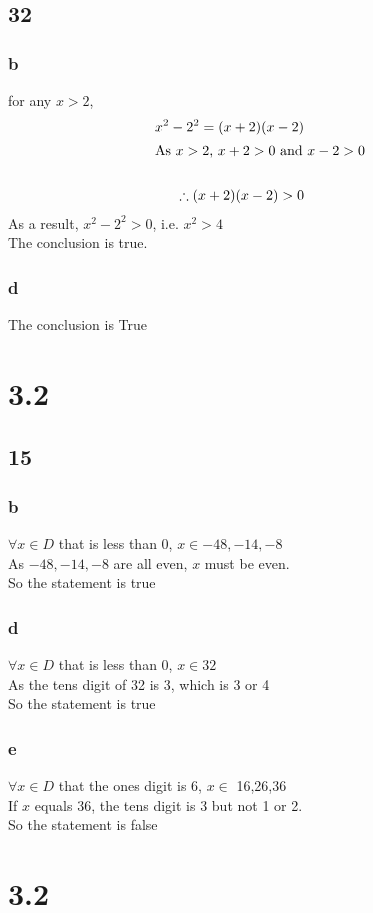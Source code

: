 \documentclass{article}
\begin{document}
\subsection{32}
\subsubsection{b}
for any $x > 2$,\\
\begin{align*}
    x^2-2^2 = (x+2)(x-2)\\
    \intertext{As $x > 2$, $x+2 > 0$ and $x-2>0$}\\
    \therefore (x+2)(x-2) > 0
\end{align*}
As a result, $x^2 - 2^2 > 0$, i.e. $x^2 > 4$\\
The conclusion is true.
\subsubsection{d}
The conclusion is True
\section{3.2}
\subsection{15}
\subsubsection{b}
$\forall x \in D$ that is less than 0, $x \in {-48,-14,-8}$\\
As $-48,-14,-8$ are all even, $x$ must be even.\\
So the statement is true
\subsubsection{d} 
$\forall x \in D$ that is less than 0, $x \in {32}$\\
As the tens digit of 32 is 3, which is 3 or 4\\
So the statement is true
\subsubsection{e}
$\forall x \in D$ that the ones digit is 6, $x \in$ {16,26,36}\\
If $x$ equals 36, the tens digit is 3 but not 1 or 2. \\
So the statement is false
\section{3.2}
\end{document}
